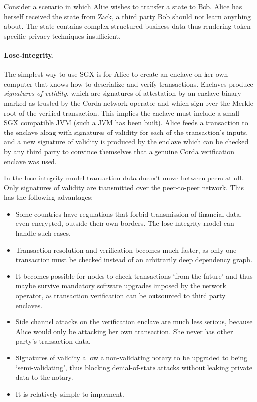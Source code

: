 \documentclass{article}
\begin{document}
Consider a scenario in which Alice wishes to transfer a state to Bob. Alice has herself received the state from
Zack, a third party Bob should not learn anything about. The state contains complex structured business data thus
rendering token-specific privacy techniques insufficient.

\paragraph{Lose-integrity.}The simplest way to use SGX is for Alice to create an enclave on her own computer that
knows how to deserialize and verify transactions. Enclaves produce \emph{signatures of validity}, which are
signatures of attestation by an enclave binary marked as trusted by the Corda network operator and which sign over
the Merkle root of the verified transaction. This implies the enclave must include a small SGX compatible JVM (such
a JVM has been built). Alice feeds a transaction to the enclave along with signatures of validity for each of the
transaction's inputs, and a new signature of validity is produced by the enclave which can be checked by
any third party to convince themselves that a genuine Corda verification enclave was used.

In the lose-integrity model transaction data doesn't move between peers at all. Only signatures of validity are
transmitted over the peer-to-peer network. This has the following advantages:

\begin{itemize}
    \item Some countries have regulations that forbid transmission of financial data, even encrypted, outside their
          own borders. The lose-integrity model can handle such cases.
    \item Transaction resolution and verification becomes much faster, as only one transaction must be checked
          instead of an arbitrarily deep dependency graph.
    \item It becomes possible for nodes to check transactions `from the future' and thus maybe survive mandatory
          software upgrades imposed by the network operator, as transaction verification can be outsourced to
          third party enclaves.
    \item Side channel attacks on the verification enclave are much less serious, because Alice would only be
          attacking her own transaction. She never has other party's transaction data.
    \item Signatures of validity allow a non-validating notary to be upgraded to being `semi-validating', thus
          blocking denial-of-state attacks without leaking private data to the notary.
    \item It is relatively simple to implement.
\end{itemize}
\end{document}
